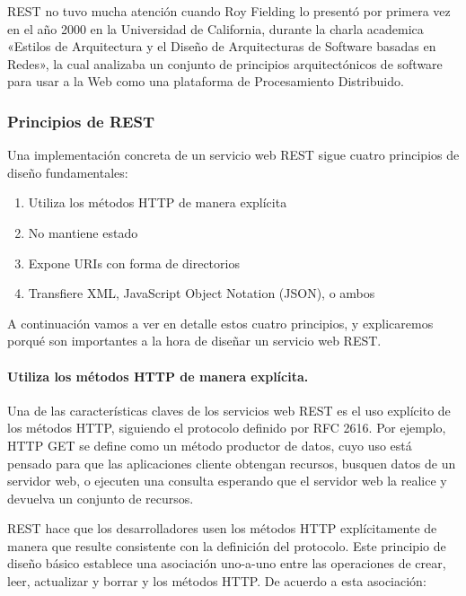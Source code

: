     REST no tuvo mucha atención cuando Roy Fielding lo presentó por primera vez en el año 2000 en la Universidad de California, durante la charla academica «Estilos de Arquitectura y el Diseño de Arquitecturas de Software basadas en Redes», la cual analizaba un conjunto de principios arquitectónicos de software para usar a la Web como una plataforma de Procesamiento Distribuido.
  
    \subsubsection{Principios de REST} %
    \label{ssub:ror_principios_de_rest}
      
      Una implementación concreta de un servicio web REST sigue cuatro principios de diseño fundamentales:
      
      \begin{enumerate}
        \item Utiliza los métodos HTTP de manera explícita
        \item No mantiene estado
        \item Expone URIs con forma de directorios
        \item Transfiere XML, JavaScript Object Notation (JSON), o ambos
      \end{enumerate}

      A continuación vamos a ver en detalle estos cuatro principios, y explicaremos porqué son importantes a la hora de diseñar un servicio web REST.
      
      \paragraph{Utiliza los métodos HTTP de manera explícita.} %
      \label{par:utiliza_los_metodos_http_de_manera_explicita}
        Una de las características claves de los servicios web REST es el uso explícito de los métodos HTTP, siguiendo el protocolo definido por RFC 2616. Por ejemplo, HTTP GET se define como un método productor de datos, cuyo uso está pensado para que las aplicaciones cliente obtengan recursos, busquen datos de un servidor web, o ejecuten una consulta esperando que el servidor web la realice y devuelva un conjunto de recursos.

        REST hace que los desarrolladores usen los métodos HTTP explícitamente de manera que resulte consistente con la definición del protocolo. Este principio de diseño básico establece una asociación uno-a-uno entre las operaciones de crear, leer, actualizar y borrar y los métodos HTTP. De acuerdo a esta asociación:

